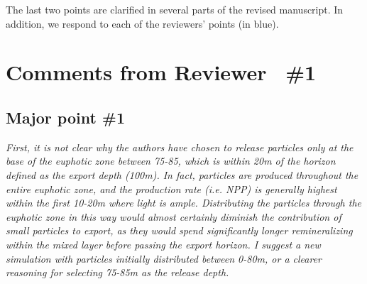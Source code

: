 \documentclass[12pt,letter]{article}
\begin{document}
The last two points are clarified in several parts of the revised manuscript. In addition, we respond to each of the reviewers' points (in blue).

\section{Comments from Reviewer  \#1}
\subsection*{Major point \#1}
\small
\textit{First, it is not clear why the authors have chosen to release particles only at the base of the euphotic zone between 75-85, which is within 20m of the horizon defined as the export depth (100m). In fact, particles are produced throughout the entire euphotic zone, and the production rate (i.e. NPP) is generally highest within the first 10-20m where light is ample. Distributing the particles through the euphotic zone in this way would almost certainly diminish the contribution of small particles to export, as they would spend significantly longer remineralizing within the mixed layer before passing the export horizon. I suggest a new simulation with particles initially distributed between 0-80m, or a clearer reasoning for selecting 75-85m as the release depth.\\}
\end{document}
